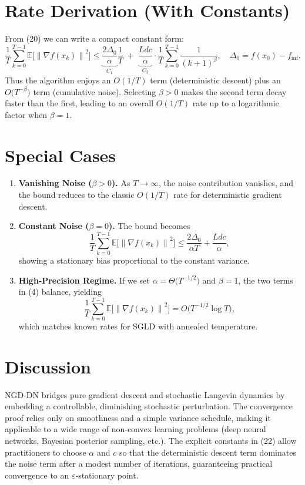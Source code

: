 \documentclass{article}
\newcommand{\E}{\mathbb{E}}
\newcommand{\norm}[1]{\left\lVert #1\right\rVert}
\begin{document}
\section*{Rate Derivation (With Constants)}
From (20) we can write a compact constant form:
\[
\frac{1}{T}\sum_{k=0}^{T-1}\E\!\big[\norm{\nabla f(x_{k})}^{2}\big]
\le 
\underbrace{\frac{2\Delta_{0}}{\alpha}}_{C_{1}}\frac{1}{T}
\;+\;
\underbrace{\frac{L d c}{\alpha}}_{C_{2}}
\cdot\frac{1}{T}\sum_{k=0}^{T-1}\frac{1}{(k+1)^{\beta}},
\quad\Delta_{0}=f(x_{0})-f_{\inf}.
\tag{22}
\]
Thus the algorithm enjoys an $O(1/T)$ term (deterministic descent) plus an
$O\!\big(T^{-\beta}\big)$ term (cumulative noise). Selecting $\beta>0$ makes the second term decay faster than the first, leading to an overall $O(1/T)$ rate up to a logarithmic factor when $\beta=1$.

\section*{Special Cases}
\begin{enumerate}[label=(\alph*)]
\item \textbf{Vanishing Noise ($\beta>0$).} As $T\to\infty$, the noise contribution vanishes, and the bound reduces to the classic $O(1/T)$ rate for deterministic gradient descent.
\item \textbf{Constant Noise ($\beta=0$).} The bound becomes
\[
\frac{1}{T}\sum_{k=0}^{T-1}\E\!\big[\norm{\nabla f(x_{k})}^{2}\big]
\le \frac{2\Delta_{0}}{\alpha T}+ \frac{L d c}{\alpha},
\]
showing a stationary bias proportional to the constant variance.
\item \textbf{High‑Precision Regime.} If we set $\alpha = \Theta\!\big(T^{-1/2}\big)$ and $\beta=1$, the two terms in (4) balance, yielding
\[
\frac{1}{T}\sum_{k=0}^{T-1}\E\!\big[\norm{\nabla f(x_{k})}^{2}\big]=O\!\big(T^{-1/2}\log T\big),
\]
which matches known rates for SGLD with annealed temperature.
\end{enumerate}

\section*{Discussion}
NGD‑DN bridges pure gradient descent and stochastic Langevin dynamics by
embedding a controllable, diminishing stochastic perturbation. The convergence proof
relies only on smoothness and a simple variance schedule, making it applicable
to a wide range of non‑convex learning problems (deep neural networks, Bayesian
posterior sampling, etc.). The explicit constants in (22) allow practitioners to
choose $\alpha$ and $c$ so that the deterministic descent term dominates the
noise term after a modest number of iterations, guaranteeing practical
convergence to an $\varepsilon$‑stationary point.
\end{document}
